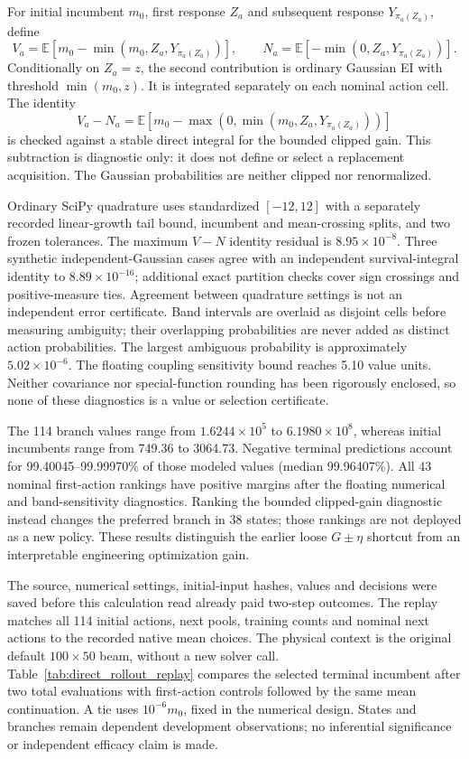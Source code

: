 For initial incumbent $m_0$, first response $Z_a$ and subsequent response $Y_{\pi_a(Z_a)}$, define
\[
 V_a=\mathbb E[m_0-\min(m_0,Z_a,Y_{\pi_a(Z_a)})],\qquad
 N_a=\mathbb E[-\min(0,Z_a,Y_{\pi_a(Z_a)})].
\]
Conditionally on $Z_a=z$, the second contribution is ordinary Gaussian EI with threshold $\min(m_0,z)$. It is integrated separately on each nominal action cell. The identity
\[
 V_a-N_a=\mathbb E[m_0-\max(0,\min(m_0,Z_a,Y_{\pi_a(Z_a)}))]
\]
is checked against a stable direct integral for the bounded clipped gain. This subtraction is diagnostic only: it does not define or select a replacement acquisition. The Gaussian probabilities are neither clipped nor renormalized.

Ordinary SciPy quadrature uses standardized $[-12,12]$ with a separately recorded linear-growth tail bound, incumbent and mean-crossing splits, and two frozen tolerances. The maximum $V-N$ identity residual is $8.95\times10^{-8}$. Three synthetic independent-Gaussian cases agree with an independent survival-integral identity to $8.89\times10^{-16}$; additional exact partition checks cover sign crossings and positive-measure ties. Agreement between quadrature settings is not an independent error certificate. Band intervals are overlaid as disjoint cells before measuring ambiguity; their overlapping probabilities are never added as distinct action probabilities. The largest ambiguous probability is approximately $5.02\times10^{-6}$. The floating coupling sensitivity bound reaches 5.10 value units. Neither covariance nor special-function rounding has been rigorously enclosed, so none of these diagnostics is a value or selection certificate.

The 114 branch values range from $1.6244\times10^5$ to $6.1980\times10^8$, whereas initial incumbents range from 749.36 to 3064.73. Negative terminal predictions account for 99.40045--99.99970\% of those modeled values (median 99.96407\%). All 43 nominal first-action rankings have positive margins after the floating numerical and band-sensitivity diagnostics. Ranking the bounded clipped-gain diagnostic instead changes the preferred branch in 38 states; those rankings are not deployed as a new policy. These results distinguish the earlier loose $G\pm\eta$ shortcut from an interpretable engineering optimization gain.

The source, numerical settings, initial-input hashes, values and decisions were saved before this calculation read already paid two-step outcomes. The replay matches all 114 initial actions, next pools, training counts and nominal next actions to the recorded native mean choices. The physical context is the original default $100\times50$ beam, without a new solver call. Table~\ref{tab:direct_rollout_replay} compares the selected terminal incumbent after two total evaluations with first-action controls followed by the same mean continuation. A tie uses $10^{-6}m_0$, fixed in the numerical design. States and branches remain dependent development observations; no inferential significance or independent efficacy claim is made.

